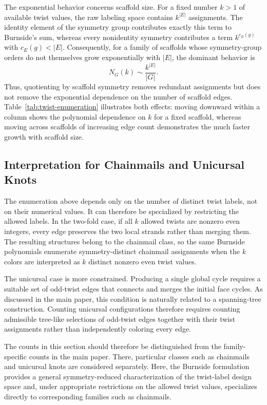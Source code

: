 \documentclass[acmtog]{acmart}
\begin{document}
The exponential behavior concerns scaffold size. For a fixed number $k>1$ of available twist values, the raw labeling space contains $k^{|E|}$ assignments. The identity element of the symmetry group contributes exactly this term to Burnside's sum, whereas every nonidentity symmetry contributes a term $k^{c_E(g)}$ with $c_E(g)<|E|$. Consequently, for a family of scaffolds whose symmetry-group orders do not themselves grow exponentially with $|E|$, the dominant behavior is
\begin{equation}
N_G(k)\sim\frac{k^{|E|}}{|G|}.
\end{equation}
Thus, quotienting by scaffold symmetry removes redundant assignments but does not remove the exponential dependence on the number of scaffold edges. Table~\ref{tab:twist-enumeration} illustrates both effects: moving downward within a column shows the polynomial dependence on $k$ for a fixed scaffold, whereas moving across scaffolds of increasing edge count demonstrates the much faster growth with scaffold size.

\subsection{Interpretation for Chainmails and Unicursal Knots}

The enumeration above depends only on the number of distinct twist labels, not on their numerical values. It can therefore be specialized by restricting the allowed labels. In the two-fold case, if all $k$ allowed twists are nonzero even integers, every edge preserves the two local strands rather than merging them. The resulting structures belong to the chainmail class, so the same Burnside polynomials enumerate symmetry-distinct chainmail assignments when the $k$ colors are interpreted as $k$ distinct nonzero even twist values.

The unicursal case is more constrained. Producing a single global cycle requires a suitable set of odd-twist edges that connects and merges the initial face cycles. As discussed in the main paper, this condition is naturally related to a spanning-tree construction. Counting unicursal configurations therefore requires counting admissible tree-like selections of odd-twist edges together with their twist assignments rather than independently coloring every edge.

The counts in this section should therefore be distinguished from the family-specific counts in the main paper. There, particular classes such as chainmails and unicursal knots are considered separately. Here, the Burnside formulation provides a general symmetry-reduced characterization of the twist-label design space and, under appropriate restrictions on the allowed twist values, specializes directly to corresponding families such as chainmails.
\end{document}
